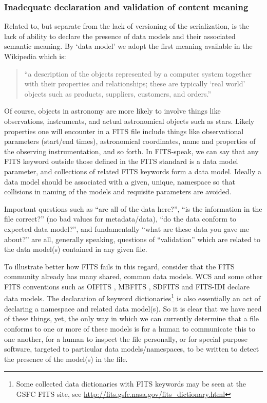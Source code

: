 \documentclass[final,authoryear,5p,times,twocolumn]{elsarticle}
\begin{document}
\subsubsection{Inadequate declaration and validation of content meaning}


Related to, but separate from the lack of versioning of the
serialization, is the lack of ability to declare the presence of data
models and their associated semantic meaning.  By `data model' we
adopt the first meaning available in the Wikipedia which is:

\begin{quote}
``a description of the objects represented by a computer system
together with their properties and relationships; these are typically
`real world' objects such as products, suppliers, customers, and
orders.''
\end{quote}


Of course, objects in astronomy are more likely to involve things like
observations, instruments, and actual astronomical objects such as
stars. Likely properties one will encounter in a FITS file include
things like observational parameters (start/end times), astronomical
coordinates, name and properties of the observing instrumentation, and
so forth. In FITS-speak, we can say that any FITS keyword outside
those defined in the FITS standard is a data model parameter, and
collections of related FITS keywords form a data model. Ideally a data
model should be associated with a given, unique, namespace so that
collisions in naming of the models and requisite parameters are
avoided.


Important questions such as ``are all of the data here?'', ``is the
information in the file correct?'' (no bad values for metadata/data),
``do the data conform to expected data model?'', and fundamentally ``what
are these data you gave me about?'' are all, generally speaking,
questions of ``validation'' which are related to the data model(s)
contained in any given file.


To illustrate better how FITS fails in this regard, consider that the
FITS community already has many shared, common data models. WCS and
some other FITS conventions such as OIFITS
\citep{2006SPIE.6268E.106T}, MBFITS \citep{2006A&A...454L..25M},
SDFITS \citep{2000ASPC..216..243G} and FITS-IDI \citep{2011AIPS114}
declare data models. The declaration of keyword
dictionaries\footnote{Some collected data dictionaries with FITS
keywords may be seen at the GSFC FITS site, see
\url{http://fits.gsfc.nasa.gov/fits\_dictionary.html}} is also essentially
an act of declaring a namespace and related data model(s). So it is
clear that we have need of these things, yet, the only way in which we
can currently determine that a file conforms to one or more of these
models is for a human to communicate this to one another, for a human
to inspect the file personally, or for special purpose software,
targeted to particular data models/namespaces, to be written to detect
the presence of the model(s) in the file.
\end{document}

